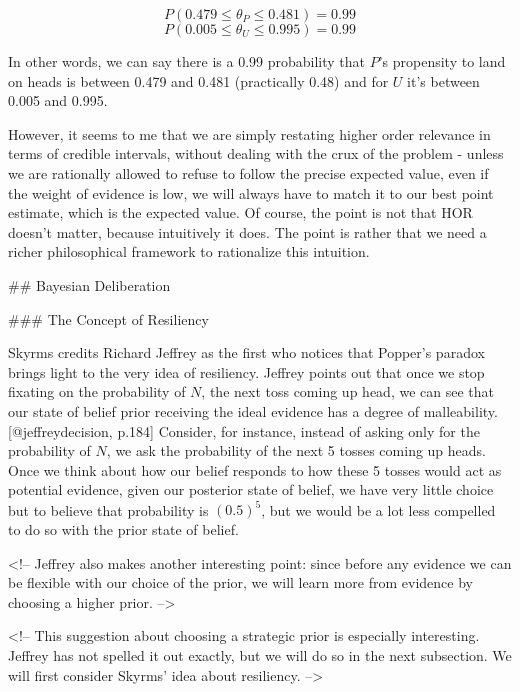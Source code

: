 \[P(0.479\leq \theta_P \leq 0.481) = 0.99\]
\[P(0.005\leq \theta_U \leq 0.995) = 0.99\]

In other words, we can say there is a 0.99 probability that \(P\)'s
propensity to land on heads is between 0.479 and 0.481 (practically
0.48) and for \(U\) it's between 0.005 and 0.995.

However, it seems to me that we are simply restating higher order
relevance in terms of credible intervals, without dealing with the crux
of the problem - unless we are rationally allowed to refuse to follow
the precise expected value, even if the weight of evidence is low, we
will always have to match it to our best point estimate, which is the
expected value. Of course, the point is not that HOR doesn't matter,
because intuitively it does. The point is rather that we need a richer
philosophical framework to rationalize this intuition.

\#\# Bayesian Deliberation

\#\#\# The Concept of Resiliency

Skyrms credits Richard Jeffrey as the first who notices that Popper's
paradox brings light to the very idea of resiliency. Jeffrey points out
that once we stop fixating on the probability of \(N\), the next toss
coming up head, we can see that our state of belief prior receiving the
ideal evidence has a degree of malleability.{[}@jeffreydecision,
p.184{]} Consider, for instance, instead of asking only for the
probability of \(N\), we ask the probability of the next 5 tosses coming
up heads. Once we think about how our belief responds to how these 5
tosses would act as potential evidence, given our posterior state of
belief, we have very little choice but to believe that probability is
\((0.5)^5\), but we would be a lot less compelled to do so with the
prior state of belief.

\textless{}!-- Jeffrey also makes another interesting point: since
before any evidence we can be flexible with our choice of the prior, we
will learn more from evidence by choosing a higher prior.
--\textgreater{}

\textless{}!-- This suggestion about choosing a strategic prior is
especially interesting. Jeffrey has not spelled it out exactly, but we
will do so in the next subsection. We will first consider Skyrms' idea
about resiliency. --\textgreater{}

